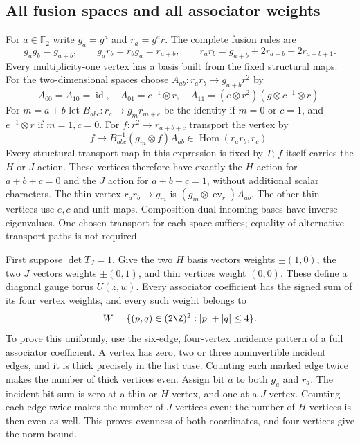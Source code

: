 \subsection{All fusion spaces and all associator weights}
For $a\in\mathbb F_2$ write $g_a=g^a$ and $r_a=g^ar$.
The complete fusion rules are
\[
 g_ag_b=g_{a+b},\qquad g_ar_b=r_bg_a=r_{a+b},\qquad
 r_ar_b=g_{a+b}+2r_{a+b}+2r_{a+b+1}.
\]
Every multiplicity-one vertex has a basis built from the fixed
structural maps. For the two-dimensional spaces choose
$A_{ab}:r_ar_b\to g_{a+b}r^2$ by
\[
 A_{00}=A_{10}=\operatorname{id},\quad
 A_{01}=c^{-1}\otimes r,\quad
 A_{11}=(e\otimes r^2)(g\otimes c^{-1}\otimes r).
\]
For $m=a+b$ let $B_{abc}:r_c\to g_mr_{m+c}$ be the identity if
$m=0$ or $c=1$, and $e^{-1}\otimes r$ if $m=1,c=0$.
For $f:r^2\to r_{a+b+c}$ transport the vertex by
\begin{equation}\label{eq:r24-vertex-transport}
 f\longmapsto B_{abc}^{-1}(g_m\otimes f)A_{ab}
       \in\operatorname{Hom}(r_ar_b,r_c).
\end{equation}
Every structural transport map in this expression is fixed by $T$;
$f$ itself carries the $H$ or $J$ action. These vertices therefore
have exactly the $H$ action for $a+b+c=0$ and the $J$ action for
$a+b+c=1$, without additional scalar characters. The thin vertex
$r_ar_b\to g_m$ is $(g_m\otimes\operatorname{ev}_r)A_{ab}$.
The other thin vertices use $e,c$ and unit maps. Composition-dual
incoming bases have inverse eigenvalues. One chosen transport for
each space suffices; equality of alternative transport paths is not
required.

First suppose $\det T_J=1$. Give the two $H$ basis vectors weights
$\pm(1,0)$, the two $J$ vectors weights $\pm(0,1)$, and thin vertices
weight $(0,0)$. These define a diagonal gauge torus $U(z,w)$.
Every associator coefficient has the signed sum of its four vertex
weights, and every such weight belongs to
\begin{equation}\label{eq:r24-weight-diamond}
 W=\{(p,q)\in(2\Z)^2:|p|+|q|\le4\}.
\end{equation}
To prove this uniformly, use the six-edge, four-vertex incidence
pattern of a full associator coefficient. A vertex has zero, two or
three noninvertible incident edges, and it is thick precisely in the
last case. Counting each marked edge twice makes the number of thick
vertices even. Assign bit $a$ to both $g_a$ and $r_a$. The incident
bit sum is zero at a thin or $H$ vertex, and one at a $J$ vertex.
Counting each edge twice makes the number of $J$ vertices even;
the number of $H$ vertices is then even as well. This proves evenness
of both coordinates, and four vertices give the norm bound.

